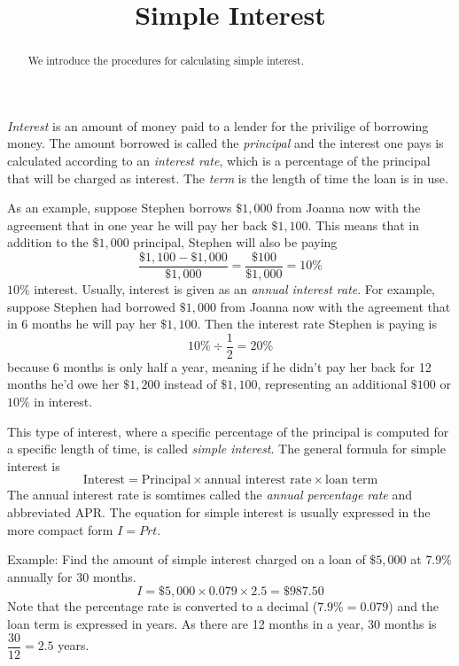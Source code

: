 \documentclass{ximera}
\title{Simple Interest}
\begin{document}
\begin{abstract}
We introduce the procedures for calculating simple interest.
\end{abstract}
\maketitle


\emph{Interest} is an amount of money paid to a lender for the privilige of borrowing money. The amount borrowed is called the \emph{principal} and the interest one pays is calculated according to an \emph{interest rate}, which is a percentage of the principal that will be charged as interest. The \emph{term} is the length of time the loan is in use.

As an example, suppose Stephen borrows $\$1,000$ from Joanna now with the agreement that in one year he will pay her back $\$1,100$. This means that in addition to the $\$1,000$ principal, Stephen will also be paying
$$
\frac{\$1,100-\$1,000}{\$1,000}=\frac{\$100}{\$1,000}=10\%
$$
$10\%$ interest. Usually, interest is given as an \emph{annual interest rate}. For example, suppose Stephen had borrowed $\$1,000$ from Joanna now with the agreement that in $6$ months he will pay her $\$1,100$. Then the interest rate Stephen is paying is
$$
10\%\div \frac{1}{2}=20\%
$$
because 6 months is only half a year, meaning if he didn't pay her back for 12 months he'd owe her $\$1,200$ instead of $\$1,100$, representing an additional $\$100$ or $10\%$ in interest.

This type of interest, where a specific percentage of the principal is computed for a specific length of time, is called \emph{simple interest}. The general formula for simple interest is
\begin{equation}\label{simpleinterest}
\text{Interest}=\text{Principal}\times\text{annual interest rate}\times\text{loan term}
\end{equation}
The annual interest rate is somtimes called the \emph{annual percentage rate} and abbreviated APR. The equation for simple interest is usually expressed in the more compact form $I=Prt$.

Example: Find the amount of simple interest charged on a loan of $\$5,000$ at $7.9\%$ annually for 30 months.
$$
I=\$5,000\times 0.079\times 2.5=\$987.50
$$
Note that the percentage rate is converted to a decimal ($7.9\%=0.079$) and the loan term is expressed in years. As there are 12 months in a year, 30 months is $\dfrac{30}{12}=2.5$ years.
\end{document}
